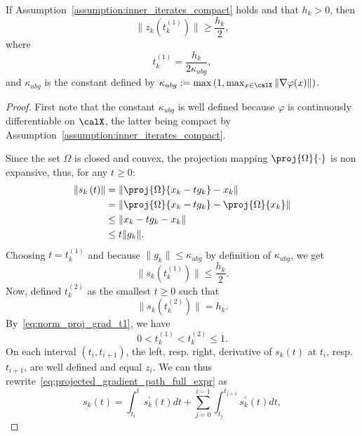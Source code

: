 \begin{lemma}\label{lemma:majoration_reduced_gradient_norm}
	If Assumption~\ref{assumption:inner_iterates_compact} holds and that $h_k>0$, then 
	\[\|z_k(t_k^{(1)})\| \ge \dfrac{h_k}{2},\]
	where \[t_k^{(1)}=\frac{h_k}{2\kappa_{ubg}},\]
	and $\kappa_{ubg}$ is the constant defined by $\kappa_{ubg} := \max\left(1, \max_{x \in \calX} \|\nabla \varphi(x)\|\right)$.
\end{lemma}

\begin{proof} 
	First note that the constant $\kappa_{ubg}$ is well defined because $\varphi$ is continuously differentiable on $\calX$, the latter being compact by Assumption~\ref{assumption:inner_iterates_compact}.
	
	Since the set $\Omega$ is closed and convex, the projection mapping $\proj{\Omega}{\cdot}$ is non expansive, thus, for any $t\ge 0$:
	\begin{equation*}
		\begin{split}
			\left\| s_k\left(t\right) \right\| & = \left\| \proj{\Omega}{x_k-tg_k}-x_k\right\| \\
			& = \left\| \proj{\Omega}{x_k-tg_k}-\proj{\Omega}{x_k}\right\| \\
			& \le \left\| x_k-tg_k-x_k\right\|\\
			& \le t\|g_k\|.
		\end{split}
	\end{equation*}
	Choosing $t=t_k^{(1)}$ and because $\|g_k\|\le \kappa_{ubg}$ by definition of $\kappa_{ubg}$, we get
	\begin{equation}\label{eq:norm_proj_grad_t1}
		\| s_k(t_k^{(1)})\| \le \dfrac{h_k}{2}.
	\end{equation}
	Now, defined $t_k^{(2)}$ as the smallest $t\ge 0$ such that
	\begin{equation}\label{eq:def_t2}
		\|s_k(t_k^{(2)})\| = h_k.
	\end{equation}
	By~\eqref{eq:norm_proj_grad_t1}, we have
	\begin{equation}\label{eq:t1_leq_t2}
		0 < t_k^{(1)} < t_k^{(2)} \le 1.
	\end{equation}
	On each interval $(t_i,t_{i+1})$, the left, resp. right, derivative of $s_k(t)$ at $t_i$, resp. $t_{i+1}$, are well defined and equal $z_i$. We can thus rewrite~\eqref{eq:projected_gradient_path_full_expr} as
	\begin{equation*}
		s_k(t) = \int_{t_i}^{t} s_k^\prime(t)dt + \sum_{j=0}^{i-1} \int_{t_j}^{t_{j+1}} s_k^\prime(t)dt,
	\end{equation*} 

\end{proof}

